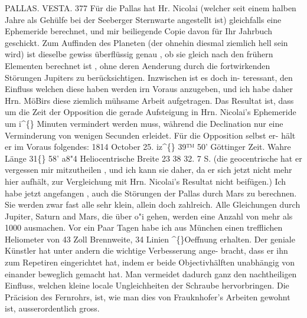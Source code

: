 \documentclass[12pt,a4paper]{article}
\newcommand{\degree}{\textdegree}
\begin{document}
\newpage
PALLAS.      VESTA. 
377 
Für  die  Pallas  hat  Hr.  Nicolai  (welcher  seit  einem  halben  Jahre  als  Gehülfe  bei  der  Seeberger 
Sternwarte  angestellt  ist)  gleichfalls  eine  Ephemeride  berechnet,  und  mir  beiliegende  Copie  davon  für 
Ihr  Jahrbuch  geschickt.  Zum  Auffinden  des  Planeten  (der  ohnehin  diesmal  ziemlich  hell  sein  wird)  ist 
dieselbe  gewiss  überflüssig  genau ,  ob  sie  gleich  nach  den  frühern  Elementen  berechnet  ist ,  ohne  deren 
Aenderung  durch  die  fortwirkenden  Störungen  Jupiters  zu  berücksichtigen.  Inzwischen  ist  es  doch  in- 
teressant, den  Einfluss  welchen  diese  haben  werden  irn  Voraus  anzugeben,  und  ich  habe  daher  Hrn. 
MöBirs  diese  ziemlich  mühsame  Arbeit  aufgetragen.  Das  Resultat  ist,  dass  um  die  Zeit  der  Opposition 
die  gerade  Aufsteigung  in  Hrn.  Nicolai's  Ephemeride  um  i\textasciicircum\{\}  Minuten  vermindert  werden  muss,  während 
die  Declination  nur  eine  Verminderung  von  wenigen  Secunden  erleidet.  Für  die  Opposition  selbst  er- 
hält er  im  Voraus  folgendes: 
1814  October  25.     iz\textasciicircum\{\}  39™  50'  Göttinger  Zeit. 
Wahre  Länge   
31\degree\{\}  58'    a8"4 
Heliocentrische  Breite   
23     38     32. 7  S. 
(die  geocentrische  hat  er  vergessen  mir  mitzutheilen ,  und  ich  kann  sie  daher,  da  er  sich  jetzt  nicht 
mehr  hier  aufhält,  zur  Vergleichung  mit  Hrn.  Nicolai's  Resultat  nicht  beifügen.) 
Ich  habe  jetzt  angefangen ,  auch  die  Störungen  der  Pallas  durch  Mars  zu  berechnen.  Sie  werden 
zwar  fast  alle  sehr  klein,  allein  doch  zahlreich.  Alle  Gleichungen  durch  Jupiter,  Saturn  and  Mars,  die 
über  o"i  gehen,  werden  eine  Anzahl  von  mehr  als  1000  ausmachen. 
Vor  ein  Paar  Tagen  habe  ich  aus  München  einen  trefflichen  Heliometer  von  43  Zoll  Brennweite, 
34  Linien  \textasciicircum\{\}Oeffnung  erhalten.  Der  geniale  Künstler  hat  unter  andern  die  wichtige  Verbesserung  ange- 
bracht, dass  er  ihn  zum  Repetiren  eingerichtet  hat,  indem  er  beide  Objectivhälften  unabhängig  von 
einander  beweglich  gemacht  hat.  Man  vermeidet  dadurch  ganz  den  nachtheiligen  Einfluss,  welchen 
kleine  locale  Ungleichheiten  der  Schraube  hervorbringen.  Die  Präcision  des  Fernrohrs,  ist,  wie  man 
dies  von  Frauknhofer's  Arbeiten  gewohnt  ist,  ausserordentlich  gross. 
\end{document}
